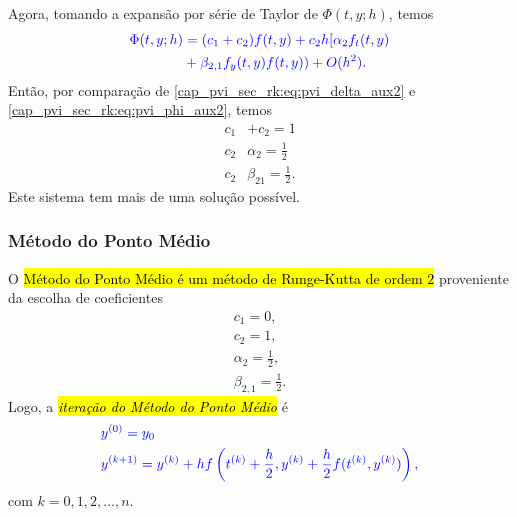 Agora, tomando a expansão por série de Taylor de $\Phi(t, y; h)$, temos
\begin{equation}\label{cap_pvi_sec_rk:eq:pvi_phi_aux2}\color{blue}\begin{aligned}
    \Phi(t, y; h) &= (c_1+c_2)f(t,y) + c_2h[\alpha_2f_t(t,y)\\
    &+\beta_{2,1}f_y(t,y)f(t,y)) + O(h^2).
  \end{aligned}
\end{equation}
Então, por comparação de \eqref{cap_pvi_sec_rk:eq:pvi_delta_aux2} e \eqref{cap_pvi_sec_rk:eq:pvi_phi_aux2}, temos
\begin{align}
  c_1&+c_2 = 1\\
  c_2&\alpha_2 = \frac{1}{2}\\
  c_2&\beta_{21} = \frac{1}{2}.
\end{align}
Este sistema tem mais de uma solução possível.

\subsubsection{Método do Ponto Médio}

O \hl{Método do Ponto Médio é um método de Runge-Kutta de ordem $2$} proveniente da escolha de coeficientes
\begin{equation}
  \begin{aligned}
    c_1 = 0, \\
    c_2 = 1, \\
    \alpha_2 = \frac{1}{2},\\
    \beta_{2,1}=\frac{1}{2}.
\end{aligned}
\end{equation}
Logo, a \hl{\emph{iteração do Método do Ponto Médio}} é
\begin{equation}\label{cap_pvi_sec_rk:eq:iter_pm}\color{blue}\begin{aligned}
    &y^{(0)} = y_0\\
    &y^{(k+1)} = y^{(k)} + hf\left(t^{(k)}+\frac{h}{2}, y^{(k)}+\frac{h}{2}f(t^{(k)},y^{(k)})\right),
  \end{aligned}
\end{equation}
com $k = 0, 1, 2, \dotsc, n$.


